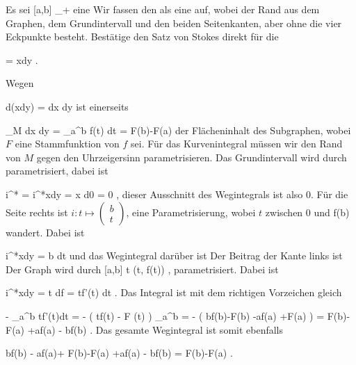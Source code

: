 {

Es sei
 { [a,b] } { \R_{+}
} {}
eine
Wir fassen den
als eine
auf, wobei der Rand aus dem Graphen, dem Grundintervall und den beiden Seitenkanten, aber ohne die vier Eckpunkte besteht. Bestätige den Satz von Stokes direkt für die

\mavergleichskette
{\vergleichskette
{ \omega
}
{ = }{ xdy
}
{  }{
}
{    }{
}
{   }{
}
}
{}{}{.}

}
{

Wegen

\mavergleichskettedisp
{\vergleichskette
{d(xdy)
}
{ =} { dx \wedge dy
}
{ } {
}
{ } {
}
{ } {
}
}
{}{}{}
ist einerseits

\mavergleichskettedisp
{\vergleichskette
{ \int_M dx \wedge dy
}
{ =} { \int_a^b f(t) dt
}
{ =} { F(b)-F(a)
}
{ } {
}
{ } {
}
}
{}{}{}
der Flächeninhalt des Subgraphen, wobei $F$ eine Stammfunktion von $f$ sei. Für das Kurvenintegral müssen wir den Rand von $M$ gegen den Uhrzeigersinn parametrisieren. Das Grundintervall wird durch
 parametrisiert, dabei ist

\mavergleichskettedisp
{\vergleichskette
{ i^*\omega
}
{ =} { i^*xdy
}
{ =} { x d0
}
{ =} { 0
}
{ } {
}
}
{}{}{,}
dieser Ausschnitt des Wegintegrals ist also $0$. Für die Seite rechts ist
$i: t \mapsto \begin{pmatrix}  b  \\t   \end{pmatrix}$,
eine Parametrisierung, wobei $t$ zwischen
\mathkor {} {0} {und} {f(b)} {}
wandert. Dabei ist

\mavergleichskettedisp
{\vergleichskette
{ i^*xdy
}
{ =} { b dt
}
{ } {
}
{ } {
}
{ } {
}
}
{}{}{}
und das Wegintegral darüber ist
 Der Beitrag der Kante links ist
 Der Graph wird durch
 {[a,b]} {
} { t } {(t, f(t))
} {,}
parametrisiert. Dabei ist

\mavergleichskettedisp
{\vergleichskette
{ i^*xdy
}
{ =} { t df
}
{ =} { tf'(t) dt
}
{ } {
}
{ } {
}
}
{}{}{.}
Das Integral ist mit dem richtigen Vorzeichen gleich

\mavergleichskettealign
{\vergleichskettealign
{ - \int_a^b tf'(t)dt
}
{ =} { -  ( tf(t) - F  (t) ) \mid  _a^b
}
{ =} { - ( bf(b)-F(b)  -af(a) +F(a) )
}
{ =} { F(b)-F(a) +af(a) - bf(b)
}
{ } {
}
}
{}
{}{.}
Das gesamte Wegintegral ist somit ebenfalls

\mavergleichskettealign
{\vergleichskettealign
{bf(b) -  af(a)+   F(b)-F(a) +af(a) - bf(b)
}
{ =} { F(b)-F(a)
}
{ } {
}
{ } {
}
{ } {
}
}
{}
{}{.}

 }


